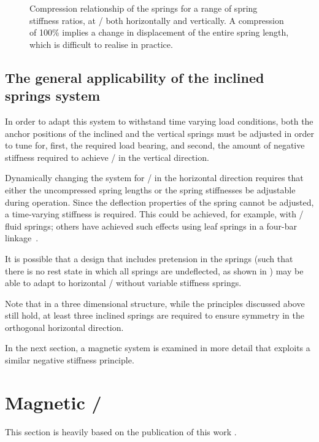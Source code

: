 \begin{figure}
\caption{Compression relationship of the springs for a range of spring
stiffness ratios, at \qzs/ both horizontally and vertically. A compression of
100\% implies a change in displacement of the entire spring length, which is
difficult to realise in practice.}
\end{figure}

\subsection{The general applicability of the inclined springs system}

In order to adapt this system to withstand time varying load conditions, both
the anchor positions of the inclined and the vertical springs must be adjusted
in order to tune for, first, the required load bearing, and second, the amount
of negative stiffness required to achieve \qzs/ in the vertical direction.

Dynamically changing the system for \qzs/ in the horizontal direction requires
that either the uncompressed spring lengths or the spring stiffnesses be
adjustable during operation. Since the deflection properties of the spring
cannot be adjusted, a time-varying stiffness is required. This could be
achieved, for example, with \magnetorh/ fluid springs; others have achieved
such effects using leaf springs in a four-bar linkage~\cite{choi2011-ietr}.

It is possible that a design that includes pretension in the springs (such
that there is no rest state in which all springs are undeflected, as shown in
) may be able to adapt to horizontal \qzs/ without variable
stiffness springs.

Note that in a three dimensional structure, while the principles discussed
above still hold, at least three inclined springs are required to ensure
symmetry in the orthogonal horizontal direction.

In the next section, a magnetic system is examined in more detail that
exploits a similar negative stiffness principle.

\section{Magnetic \qzs/}

This section is heavily based on the publication of this work \parencite{robertson2009-jsv}.

